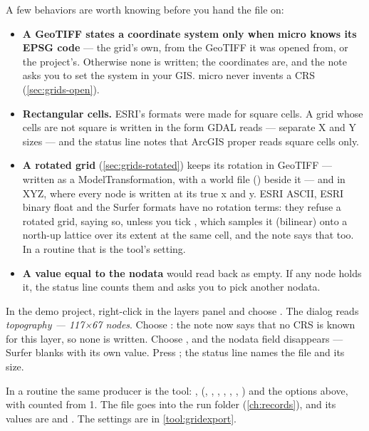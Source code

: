 A few behaviors are worth knowing before you hand the file on:

\begin{itemize}
\item \textbf{A GeoTIFF states a coordinate system only when micro knows its EPSG code} — the grid's own, from the GeoTIFF it was opened from, or the project's. Otherwise none is written; the coordinates are, and the note asks you to set the system in your GIS. micro never invents a CRS (\cref{sec:grids-open}).
\item \textbf{Rectangular cells.} ESRI's formats were made for square cells. A grid whose cells are not square is written in the form GDAL reads — separate X and Y sizes — and the status line notes that ArcGIS proper reads square cells only.
\item \textbf{A rotated grid} (\cref{sec:grids-rotated}) keeps its rotation in GeoTIFF — written as a ModelTransformation, with a world file () beside it — and in XYZ, where every node is written at its true x and y. ESRI ASCII, ESRI binary float and the Surfer formats have no rotation terms: they refuse a rotated grid, saying so, unless you tick , which samples it (bilinear) onto a north-up lattice over its extent at the same cell, and the note says that too. In a routine that is the tool's  setting.

\item \textbf{A value equal to the nodata} would read back as empty. If any node holds it, the status line counts them and asks you to pick another nodata.
\end{itemize}

\begin{tryit}
In the demo project, right-click  in the layers panel and choose . The dialog reads \emph{topography — 117×67 nodes}. Choose : the note now says that no CRS is known for this layer, so none is written. Choose , and the nodata field disappears — Surfer blanks with its own value. Press ; the status line names the file and its size.
\end{tryit}

In a routine the same producer is the  tool: ,  (, , , , , , ) and the options above, with  counted from 1. The file goes into the run folder (\cref{ch:records}), and its values are  and . The settings are in \cref{tool:gridexport}.

